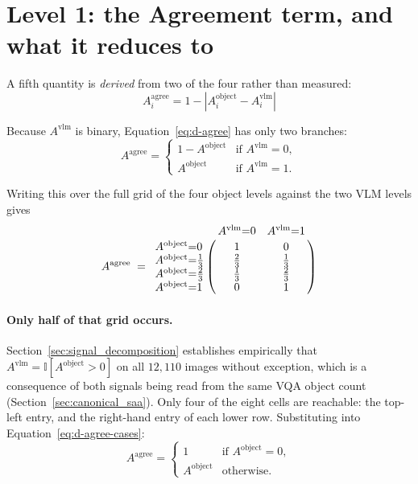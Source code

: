 \documentclass[12pt,a4paper]{report}
\begin{document}
\section{Level 1: the Agreement term, and what it reduces to}

A fifth quantity is \emph{derived} from two of the four rather than measured:
\begin{equation}
A_i^{\text{agree}} = 1 - \left|A_i^{\text{object}} - A_i^{\text{vlm}}\right|
\label{eq:d-agree}
\end{equation}

Because $A^{\text{vlm}}$ is binary, Equation~\ref{eq:d-agree} has only two branches:
\begin{equation}
A^{\text{agree}} =
\begin{cases}
1 - A^{\text{object}} & \text{if } A^{\text{vlm}} = 0,\\[2pt]
A^{\text{object}}     & \text{if } A^{\text{vlm}} = 1.
\end{cases}
\label{eq:d-agree-cases}
\end{equation}

Writing this over the full grid of the four object levels against the two VLM levels gives
\[
A^{\text{agree}} \;=\;
\bordermatrix{
 & A^{\text{vlm}}{=}0 & A^{\text{vlm}}{=}1 \cr
A^{\text{object}}{=}0     & 1     & 0     \cr
A^{\text{object}}{=}\tfrac13 & \tfrac23 & \tfrac13 \cr
A^{\text{object}}{=}\tfrac23 & \tfrac13 & \tfrac23 \cr
A^{\text{object}}{=}1     & 0     & 1     \cr}
\]

\paragraph{Only half of that grid occurs.} Section~\ref{sec:signal_decomposition} establishes empirically that $A^{\text{vlm}} = \mathbb{I}[A^{\text{object}} > 0]$ on all $12{,}110$ images without exception, which is a consequence of both signals being read from the same VQA object count (Section~\ref{sec:canonical_saa}). Only four of the eight cells are reachable: the top-left entry, and the right-hand entry of each lower row. Substituting into Equation~\ref{eq:d-agree-cases}:
\begin{equation}
A^{\text{agree}} =
\begin{cases}
1 & \text{if } A^{\text{object}} = 0,\\[2pt]
A^{\text{object}} & \text{otherwise.}
\end{cases}
\label{eq:d-agree-reduced}
\end{equation}
\end{document}
